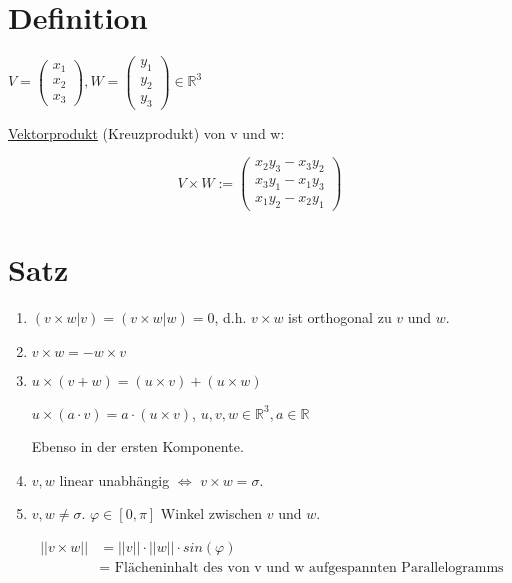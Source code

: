 \documentclass[a4paper, openany]{book}
\begin{document}
        \section{Definition}

        $V = \begin{pmatrix}x_1 \\ x_2 \\ x_3 \end{pmatrix}, W = \begin{pmatrix}y_1 \\ y_2 \\ y_3 \end{pmatrix} \in \mathbb{R}^3$

        \par \medskip

        \underline{Vektorprodukt} (Kreuzprodukt) von v und w:

        \[ V \times W := \begin{pmatrix}x_2y_3 - x_3y_2 \\ x_3y_1 - x_1 y_3 \\ x_1y_2 - x_2y_1 \end{pmatrix} \]

        \section{Satz}

        \begin{enumerate}[label=(\alph*)]
          \item $(v \times w | v) = (v \times w | w) = 0$, d.h. $v \times w$ ist orthogonal zu $v$ und $w$.

          \item $v \times w = -w \times v$

          \item $u \times (v+w) = (u \times v) + (u \times w)$

          $u \times (a \cdot v) = a \cdot (u \times v)$, $u,v,w \in \mathbb{R}^3, a \in \mathbb{R}$

          \par \medskip

          Ebenso in der ersten Komponente.

          \item $v,w$ linear unabhängig $\Leftrightarrow$ $v \times w = \sigma$.

          \item $v,w \neq \sigma$. $\varphi \in [0, \pi]$ Winkel zwischen $v$ und $w$.

          \par \medskip

          \begin{align*}
            ||v \times w|| & = ||v|| \cdot ||w|| \cdot sin(\varphi) \\
                           & = \text{ Flächeninhalt des von v und w aufgespannten Parallelogramms}
          \end{align*}
        \end{enumerate}
\end{document}
